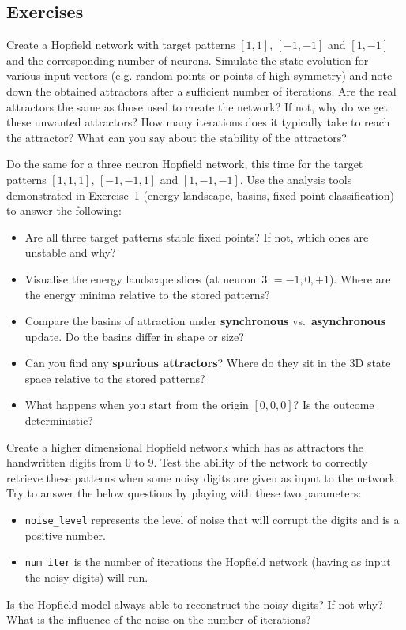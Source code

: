 \subsection*{Exercises}
\begin{questions}
    \item Create a Hopfield network with target patterns $[1, 1]$, $[-1, -1]$ and $[1, -1]$ and the corresponding number of neurons.
    Simulate the state evolution for various input vectors (e.g. random points or points of high symmetry) and note down the obtained attractors after a sufficient number of iterations.
    Are the real attractors the same as those used to create the network?
    If not, why do we get these unwanted attractors?
    How many iterations does it typically take to reach the attractor?
    What can you say about the stability of the attractors?

    \item Do the same for a three neuron Hopfield network, this time for the target patterns $[1, 1, 1]$, $[-1, -1, 1]$ and $[1, -1, -1]$.
    Use the analysis tools demonstrated in Exercise~1 (energy landscape, basins, fixed-point classification) to answer the following:
    \begin{itemize}
        \item Are all three target patterns stable fixed points?  If not, which ones are unstable and why?
        \item Visualise the energy landscape slices (at neuron~3 $= -1, 0, +1$).  Where are the energy minima relative to the stored patterns?
        \item Compare the basins of attraction under \textbf{synchronous} vs.\ \textbf{asynchronous} update.  Do the basins differ in shape or size?
        \item Can you find any \textbf{spurious attractors}?  Where do they sit in the 3D state space relative to the stored patterns?
        \item What happens when you start from the origin $[0, 0, 0]$?  Is the outcome deterministic?
    \end{itemize}

    \item Create a higher dimensional Hopfield network which has as attractors the handwritten digits from $0$ to $9$.
    Test the ability of the network to correctly retrieve these patterns when some noisy digits are given as input to the network.
    Try to answer the below questions by playing with these two parameters:
    \begin{itemize}
        \item \texttt{noise\_level} represents the level of noise that will corrupt the digits and is a positive number.
        \item \texttt{num\_iter} is the number of iterations the Hopfield network (having as input the noisy digits) will run.
    \end{itemize}
    Is the Hopfield model always able to reconstruct the noisy digits? If not why?
    What is the influence of the noise on the number of iterations?


\end{questions}
